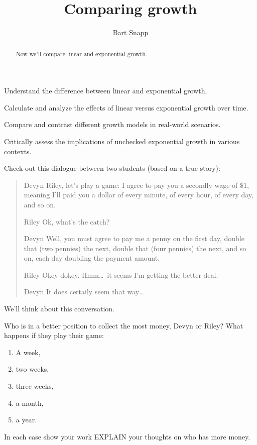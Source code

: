 \documentclass[nooutcomes,noauthor,hints,12pt,handout]{ximera}
\title{Comparing growth}
\author{Bart Snapp}
\begin{document}
\begin{abstract}
  Now we'll compare linear and exponential growth.
\end{abstract}
\maketitle

\begin{listOutcomes}
\item Understand the difference between linear and exponential growth.
\item Calculate and analyze the effects of linear versus exponential growth over time.
\item Compare and contrast different growth models in real-world scenarios.
\item Critically assess the implications of unchecked exponential growth in various contexts.
\end{listOutcomes}
Check out this dialogue between two students (based on a true story):

\begin{mdframed}[style=OutcomeStyle]
  \begin{quote}
\begin{dialogue}
\item[Devyn] Riley, let's play a game: I agree to pay you a secondly
  wage of $\$1$, meaning I'll paid you a dollar  of
  every minute, of every hour, of every day, and so on.
\item[Riley] Ok, what's the catch? 
\item[Devyn] Well, you must agree to pay me a penny on the first day,
  double that (two pennies) the next, double that (four pennies) the
  next, and so on, each day doubling the payment amount.
\item[Riley] Okey dokey. Hmm\dots\ it seems I'm getting the better deal. 
\item[Devyn] It does certaily seem that way\dots
\end{dialogue}
  \end{quote}
\end{mdframed}
We'll think about this conversation.




\mynewpage


\begin{question}
 Who is in a better position to collect the most money, Devyn or
 Riley? What happens if they play their game:
 \begin{enumerate}
 \item A week,
 \item two weeks,
 \item three weeks,
 \item a month,
 \item a year.
 \end{enumerate}
 In each case show your work EXPLAIN your thoughts on who has more money.
 \end{question}
 
\end{document}
